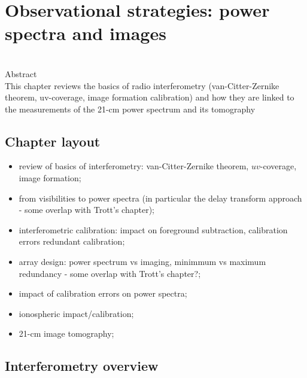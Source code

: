 \chapter{Observational strategies: power spectra and images}

\begin{bf}
  \author{Gianni Bernardi (INAF-IRA)}\\
  
Abstract\\

This chapter reviews the basics of radio interferometry (van-Citter-Zernike theorem, uv-coverage, image formation calibration) and how they are linked to the measurements of the 21-cm power spectrum and its tomography 
\end{bf}


\section{Chapter layout}

\begin{itemize}
\item review of basics of interferometry: van-Citter-Zernike theorem, $uv$-coverage, image formation;
\item from visibilities to power spectra (in particular the delay transform approach - some overlap with Trott's chapter);
\item interferometric calibration: impact on foreground subtraction, calibration errors redundant calibration;
\item array design: power spectrum vs imaging, minimmum vs maximum redundancy - some overlap with Trott's chapter?;
\item impact of calibration errors on power spectra;
\item ionospheric impact/calibration;
\item 21-cm image tomography;  
\end{itemize}

\section{Interferometry overview}

